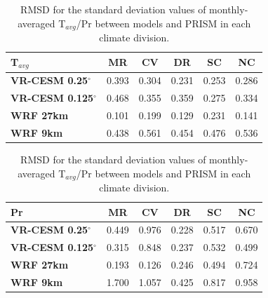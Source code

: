 \begin{table}
\begin{center}
\caption{RMSD for the standard deviation values of monthly-averaged T$_{avg}$/Pr between models and PRISM in each climate division.}
\label{tab:stat_std}
\begin{tabular*}{5.5in}{l @{\extracolsep{\fill}}ccccc}
\hline \textbf{T$_{avg}$} & \textbf{MR}  & \textbf{CV}  & \textbf{DR} & \textbf{SC} & \textbf{NC} \\
\hline \textbf{VR-CESM 0.25$^\circ$}  & 0.393 & 	0.304 & 	0.231 & 	0.253 & 	0.286  \\
\textbf{VR-CESM 0.125$^\circ$} &  0.468 & 	0.355	&  0.359 & 	0.275 & 	0.334 \\
\textbf{WRF 27km} &  0.101 & 	0.199 & 	0.129 & 	0.231 & 	0.141 \\
\textbf{WRF 9km}  &  0.438 & 	0.561 & 	0.454 & 	0.476 & 	0.536 \\
\hline
\end{tabular*}

\begin{tabular*}{5.5in}{l @{\extracolsep{\fill}}ccccc}
\hline \textbf{Pr} & \textbf{MR}  &  \textbf{CV} & \textbf{DR} & \textbf{SC} & \textbf{NC} \\
\hline \textbf{VR-CESM 0.25$^\circ$} & 0.449 &	 0.976 &	0.228 &	0.517 &	0.670 \\
\textbf{VR-CESM 0.125$^\circ$}  & 0.315 &	0.848	 &  0.237	& 0.532 &	0.499 \\
\textbf{WRF 27km}  & 0.193 &	0.126  &	0.246  &	0.494  &	0.724  \\
\textbf{WRF 9km}  & 1.700  &	1.057  &	0.425  &	 0.817  &	0.958 \\
\hline
\end{tabular*}

\end{center}
\end{table}

